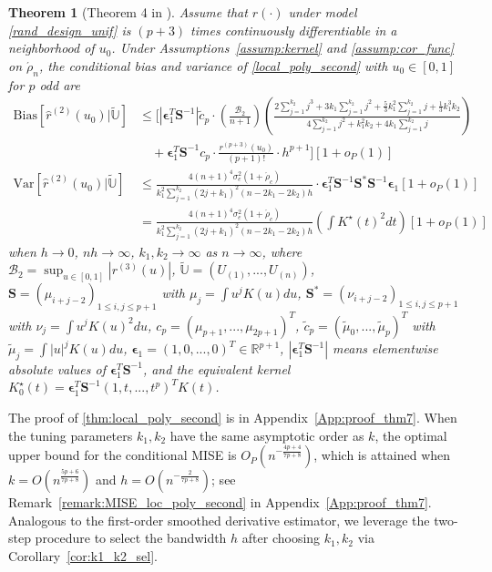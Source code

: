 \documentclass{uwstat572}
\newtheorem{theorem}{Theorem}
\theoremstyle{definition}
\renewcommand{\hat}{\widehat}
\renewcommand{\tilde}{\widetilde}
\theoremstyle{theorem}
\begin{document}
\begin{theorem}[Theorem 4 in \citealt{liu2020smoothed}]
\label{thm:local_poly_second}
Assume that $r(\cdot)$ under model \eqref{rand_design_unif} is $(p+3)$ times continuously differentiable in a neighborhood of $u_0$. Under Assumptions~\ref{assump:kernel} and \ref{assump:cor_func} on $\acute{\rho}_n$, the conditional bias and variance of \eqref{local_poly_second} with $u_0\in [0,1]$ for $p$ odd are
\begin{align*}
	\mathrm{Bias}\left[\hat{r}^{(2)}(u_0) | \tilde{\mathbb{U}}\right] &\leq \Bigg[\left|\bm{\epsilon}_1^T \bm{S}^{-1} \right|\tilde{c}_p\cdot \left(\frac{\mathcal{B}_2}{n+1}\right) \left(\frac{2\sum_{j=1}^{k_2} j^3 + 3k_1 \sum_{j=1}^{k_2} j^2 + \frac{5}{3} k_1^2 \sum_{j=1}^{k_2}j + \frac{1}{3} k_1^3k_2}{4 \sum_{j=1}^{k_2}j^2 + k_1^2k_2 + 4k_1\sum_{j=1}^{k_2} j} \right)\\
	&\quad + \bm{\epsilon}_1^T \bm{S}^{-1} c_p \cdot \frac{r^{(p+3)}(u_0)}{(p+1)!}\cdot h^{p+1} \Bigg] \left[1+o_P(1)\right]\\
	\mathrm{Var}\left[\hat{r}^{(2)}(u_0) | \tilde{\mathbb{U}}\right] &\leq \frac{4(n+1)^4\sigma_e^2(1+\acute{\rho}_c)}{k_1^2 \sum_{j=1}^{k_2}(2j+k_1)^2 (n-2k_1-2k_2) h}\cdot \bm{\epsilon}_1^T \bm{S}^{-1}\bm{S}^*\bm{S}^{-1}\bm{\epsilon}_1 \left[1+o_P(1)\right]\\
	&= \frac{4(n+1)^4\sigma_e^2(1+\acute{\rho}_c)}{k_1^2 \sum_{j=1}^{k_2}(2j+k_1)^2 (n-2k_1-2k_2) h} \left(\int K^{\star}(t)^2 dt\right) \left[1+o_P(1)\right]
\end{align*}
when $h\to 0$, $nh\to \infty$, $k_1,k_2\to \infty$ as $n\to \infty$, where $\mathcal{B}_2=\sup_{u\in [0,1]}\left|r^{(3)}(u)\right|$, $\tilde{\mathbb{U}}=\left(U_{(1)},...,U_{(n)}\right)$, $\bm{S}=\left(\mu_{i+j-2}\right)_{1\leq i,j\leq p+1}$ with $\mu_j=\int u^j K(u) du$, $\bm{S}^*=\left(\nu_{i+j-2}\right)_{1\leq i,j\leq p+1}$ with $\nu_j = \int u^j K(u)^2 du$, $c_p=\left(\mu_{p+1},...,\mu_{2p+1} \right)^T$, $\tilde{c}_p=\left(\tilde{\mu}_0,...,\tilde{\mu}_{p} \right)^T$ with $\tilde{\mu}_j=\int |u|^j K(u) du$, $\bm{\epsilon}_1=(1,0,...,0)^T \in \mathbb{R}^{p+1}$, $\left|\bm{\epsilon}_1^T\bm{S}^{-1}\right|$ means elementwise absolute values of $\bm{\epsilon}_1^T\bm{S}^{-1}$, and the equivalent kernel $K_0^{\star}(t) = \bm{\epsilon}_1^T \bm{S}^{-1} \left(1,t,...,t^p\right)^T K(t)$.
\end{theorem}

\noindent The proof of \autoref{thm:local_poly_second} is in Appendix~\ref{App:proof_thm7}. When the tuning parameters $k_1,k_2$ have the same asymptotic order as $k$, the optimal upper bound for the conditional MISE is $O_P\left(n^{-\frac{4p+4}{7p+8}}\right)$, which is attained when $k=O\left(n^{\frac{5p+6}{7p+8}}\right)$ and $h=O\left(n^{-\frac{2}{7p+8}}\right)$; see Remark~\ref{remark:MISE_loc_poly_second} in Appendix~\ref{App:proof_thm7}. Analogous to the first-order smoothed derivative estimator, we leverage the two-step procedure to select the bandwidth $h$ after choosing $k_1,k_2$ via Corollary~\ref{cor:k1_k2_sel}.
\end{document}
